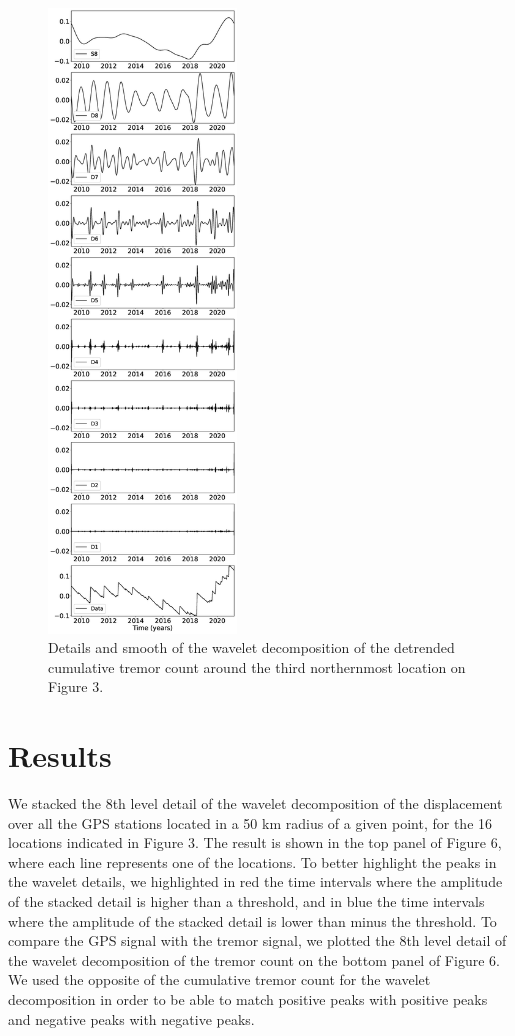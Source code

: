 \documentclass[draft]{agujournal2018}
\begin{document}
\begin{figure}
\noindent\includegraphics[width=5cm, trim={0cm 0cm 0cm 0cm},clip]{figures/tremor_13.eps}
\caption{Details and smooth of the wavelet decomposition of the detrended cumulative tremor count around the third northernmost location on Figure 3.}
\label{pngfiguresample}
\end{figure}

\section{Results}

We stacked the 8th level detail of the wavelet decomposition of the displacement over all the GPS stations located in a 50 km radius of a given point, for the 16 locations indicated in Figure 3. The result is shown in the top panel of Figure 6, where each line represents one of the locations. To better highlight the peaks in the wavelet details, we highlighted in red the time intervals where the amplitude of the stacked detail is higher than a threshold, and in blue the  time intervals where the amplitude of the stacked detail is lower than minus the threshold. To compare the GPS signal with the tremor signal, we plotted the 8th level detail of the wavelet decomposition of the tremor count on the bottom panel of Figure 6. We used the opposite of the cumulative tremor count for the wavelet decomposition in order to be able to match positive peaks with positive peaks and negative peaks with negative peaks.
\end{document}
